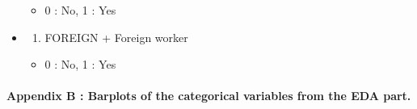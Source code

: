 \documentclass[
]{article}
\providecommand{\tightlist}{%
  \setlength{\itemsep}{0pt}\setlength{\parskip}{0pt}}
\begin{document}
\begin{itemize}
  \begin{itemize}
  \tightlist
  \item
    0 : No, 1 : Yes
  \end{itemize}
\item
  \begin{enumerate}
  \def\labelenumi{\arabic{enumi})}
  \setcounter{enumi}{30}
  \tightlist
  \item
    FOREIGN + Foreign worker
  \end{enumerate}

  \begin{itemize}
  \tightlist
  \item
    0 : No, 1 : Yes
  \end{itemize}
\end{itemize}

\hypertarget{appendix-b-barplots-of-the-categorical-variables-from-the-eda-part.}{%
\paragraph{Appendix B : Barplots of the categorical variables from the
EDA
part.}\label{appendix-b-barplots-of-the-categorical-variables-from-the-eda-part.}}
\end{document}
